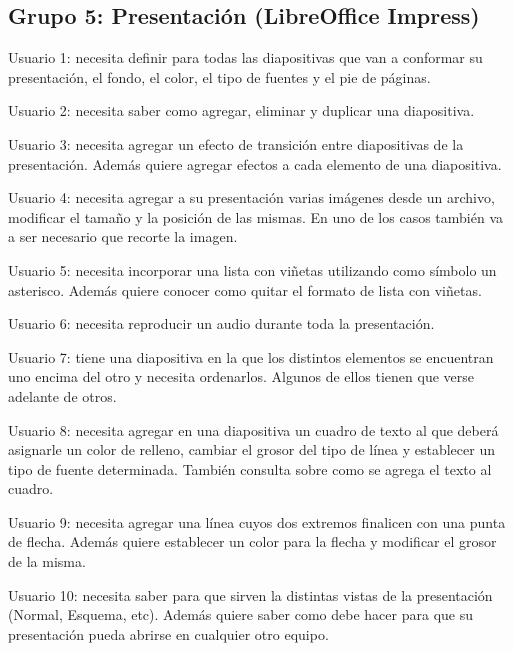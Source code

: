 \documentclass[12pt]{article}
\begin{document}
\subsection*{Grupo 5: Presentación (LibreOffice Impress)}

\begin{description}

    \item{Usuario 1}: necesita definir para todas las diapositivas que van a
    conformar su presentación, el fondo, el color, el tipo de fuentes y el pie
    de páginas.

    \item{Usuario 2}: necesita saber como agregar, eliminar y duplicar una
    diapositiva.

    \item{Usuario 3}: necesita agregar un efecto de transición entre
    diapositivas de la presentación. Además quiere agregar efectos a cada
    elemento de una diapositiva.

    \item{Usuario 4}: necesita agregar a su presentación varias imágenes desde
    un archivo, modificar el tamaño y la posición de las mismas. En uno de los
    casos también va a ser necesario que recorte la imagen.

    \item{Usuario 5}: necesita incorporar una lista con viñetas utilizando
    como símbolo un asterisco. Además quiere conocer como quitar el formato de
    lista con viñetas.

    \item{Usuario 6}: necesita reproducir un audio durante toda la
    presentación.

    \item{Usuario 7}: tiene una diapositiva en la que los distintos elementos
    se encuentran uno encima del otro y necesita ordenarlos. Algunos de ellos
    tienen que verse adelante de otros.

    \item{Usuario 8}: necesita agregar en una diapositiva un cuadro de texto
    al que deberá asignarle un color de relleno, cambiar el grosor del tipo de
    línea y establecer un tipo de fuente determinada. También consulta sobre
    como se agrega el texto al cuadro.

    \item{Usuario 9}: necesita agregar una línea cuyos dos extremos finalicen
    con una punta de flecha. Además quiere establecer un color para la flecha
    y modificar el grosor de la misma.

    \item{Usuario 10}: necesita saber para que sirven la distintas vistas de
    la presentación (Normal, Esquema, etc). Además quiere saber como debe
    hacer para que su presentación pueda abrirse en cualquier otro equipo.

\end{description}
\end{document}
